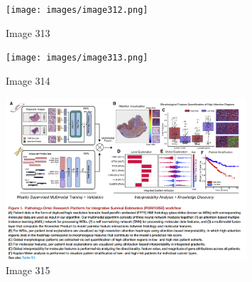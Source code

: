 \documentclass{article}%
\begin{document}
%


\begin{figure}[h!]%
\centering%
\texttt{[image: images/image312.png]}%
\caption{Image 313}%
\end{figure}

%


\begin{figure}[h!]%
\centering%
\texttt{[image: images/image313.png]}%
\caption{Image 314}%
\end{figure}

%


\begin{figure}[h!]%
\centering%
\includegraphics[width=0.8\textwidth]{images/image314.png}%
\caption{Image 315}%
\end{figure}

%
\end{document}
